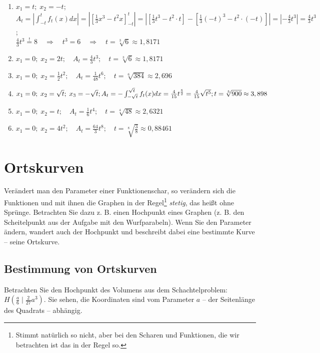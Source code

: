 \documentclass[11pt,a4paper,twoside,fleqn]{article}
\begin{document}
  \begin{solution} \begin{multicols}{2}
    \begin{enumerate}
    \item $x_1=t;\;x_2=-t$;\\
      $A_t=|\int_{-t}^tf_t(x)dx|=
      |[\frac 1 3 x^3 - t^2x]_{-t}^t|=
      |[\frac 1 3 t^3 - t^2\cdot t] - [\frac 1 3 (-t)^3 - t^2\cdot (-t)]|
      =|-\frac 4 3 t^3|=\frac 4 3 t^3$;\\
      $\frac 4 3 t^3\overset{!}{=}8 \quad\Rightarrow\quad
      t^3= 6 \quad\Rightarrow\quad
      t=\sqrt[3]{6}\approx 1,8171$
    \item $x_1=0;\; x_2=2t;\quad A_t=\frac {4} 3 t^3;\quad
      t=\sqrt[3]{6}\approx 1,8171$
    \item $x_1=0;\; x_2=\frac 1 2 t^2; \quad A_t=\frac 1 {48} t^6; \quad
      t=\sqrt[6]{384}\approx 2,696$
    \item $x_1=0;\; x_2=\sqrt{t};\; x_3=-\sqrt{t};\\
      A_t=-\int_{-\sqrt{t}}^{\sqrt{t}}f_t(x)dx=
      \frac 4 {15}t^{\frac 5 2}=\frac 4 {15}\sqrt{t^5};\\
      t=\sqrt[5]{900}\approx 3,898$
    \item $x_1=0;\;x_2=t;\quad
      A_t=\frac 1 6 t^4;\quad
      t=\sqrt[4]{48}\approx 2,6321$
    \item $x_1=0;\;x_2=4t^2;\quad
      A_t=\frac{64} 3 t^8;\quad
      t=\sqrt[8]{\frac 3 8}\approx 0,88461$
    \end{enumerate}
  \end{multicols}
\end{solution}
\section{Ortskurven}
Verändert man den Parameter einer Funktionenschar, so verändern sich
die Funktionen und mit ihnen die Graphen in der Regel\footnote{Stimmt
  natürlich so nicht, aber bei den Scharen und Funktionen, die wir
  betrachten ist das in der Regel so.}  \emph{stetig}, das
heißt ohne Sprünge. Betrachten Sie dazu z. B. einen Hochpunkt eines
Graphen (z. B. den Scheitelpunkt aus der Aufgabe mit den
Wurfparabeln). Wenn Sie den Parameter ändern, wandert auch der
Hochpunkt und beschreibt dabei eine bestimmte Kurve -- seine
Ortskurve.
\subsection{Bestimmung von Ortskurven}
Betrachten Sie den Hochpunkt des Volumens aus dem Schachtelproblem:
$H\left(\frac a 6\mid\frac 2 {27}a^3\right)$. %
Sie sehen, die Koordinaten sind vom Parameter $a$ -- der Seitenlänge
des Quadrats -- abhängig.
\end{document}
